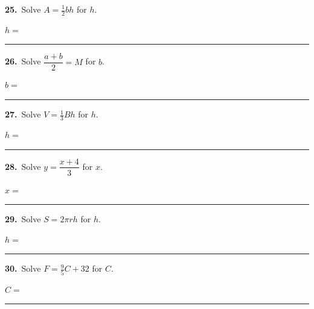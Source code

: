 \documentclass[11pt,letterpaper]{article}
\begin{document}
\needspace{3.5cm}\par\vspace{3mm}\noindent \begin{minipage}[t][3.0cm]{0.48\linewidth}\raggedright{\color{fmturn}\bfseries 25.}\ Solve $A = \tfrac12 bh$ for $h$.\par\vfill\hfill $h = $\ \rule{3.2cm}{0.4pt}\end{minipage}\hfill \begin{minipage}[t][3.0cm]{0.48\linewidth}\raggedright{\color{fmturn}\bfseries 26.}\ Solve $\dfrac{a + b}{2} = M$ for $b$.\par\vfill\hfill $b = $\ \rule{3.2cm}{0.4pt}\end{minipage}\par
\needspace{3.5cm}\par\vspace{3mm}\noindent \begin{minipage}[t][3.0cm]{0.48\linewidth}\raggedright{\color{fmturn}\bfseries 27.}\ Solve $V = \tfrac13 Bh$ for $h$.\par\vfill\hfill $h = $\ \rule{3.2cm}{0.4pt}\end{minipage}\hfill \begin{minipage}[t][3.0cm]{0.48\linewidth}\raggedright{\color{fmturn}\bfseries 28.}\ Solve $y = \dfrac{x + 4}{3}$ for $x$.\par\vfill\hfill $x = $\ \rule{3.2cm}{0.4pt}\end{minipage}\par
\needspace{3.5cm}\par\vspace{3mm}\noindent \begin{minipage}[t][3.0cm]{0.48\linewidth}\raggedright{\color{fmturn}\bfseries 29.}\ Solve $S = 2\pi rh$ for $h$.\par\vfill\hfill $h = $\ \rule{3.2cm}{0.4pt}\end{minipage}\hfill \begin{minipage}[t][3.0cm]{0.48\linewidth}\raggedright{\color{fmturn}\bfseries 30.}\ Solve $F = \tfrac95 C + 32$ for $C$.\par\vfill\hfill $C = $\ \rule{3.2cm}{0.4pt}\end{minipage}\par
\end{document}
